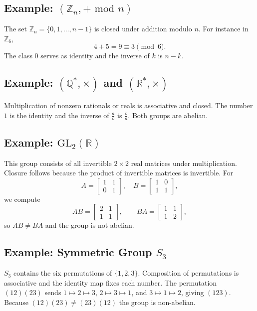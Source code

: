 \documentclass[12pt]{article}
\begin{document}
\subsection*{Example: $(\mathbb{Z}_n,+ \text{ mod } n)$}
The set $\mathbb{Z}_n=\{0,1,\ldots,n-1\}$ is closed under addition modulo $n$.
For instance in $\mathbb{Z}_6$,
\[
4+5=9\equiv 3 \pmod 6.
\]
The class $0$ serves as identity and the inverse of $k$ is $n-k$.

\subsection*{Example: $(\mathbb{Q}^*,\times)$ and $(\mathbb{R}^*,\times)$}
Multiplication of nonzero rationals or reals is associative and closed.
The number $1$ is the identity and the inverse of $\frac{a}{b}$ is $\frac{b}{a}$.
Both groups are abelian.

\subsection*{Example: $\mathrm{GL}_2(\mathbb{R})$}
This group consists of all invertible $2\times2$ real matrices under multiplication.
Closure follows because the product of invertible matrices is invertible.
For
\[
A=\begin{bmatrix}1&1\\0&1\end{bmatrix},\quad
B=\begin{bmatrix}1&0\\1&1\end{bmatrix},
\]
we compute
\[
AB=\begin{bmatrix}2&1\\1&1\end{bmatrix},\qquad
BA=\begin{bmatrix}1&1\\1&2\end{bmatrix},
\]
so $AB\neq BA$ and the group is not abelian.

\subsection*{Example: Symmetric Group $S_3$}
$S_3$ contains the six permutations of $\{1,2,3\}$.
Composition of permutations is associative and the identity map fixes each number.
The permutation $(12)(23)$ sends $1\mapsto2\mapsto3$, $2\mapsto3\mapsto1$, and $3\mapsto1\mapsto2$, giving $(123)$.
Because $(12)(23)\neq(23)(12)$ the group is non-abelian.
\end{document}
